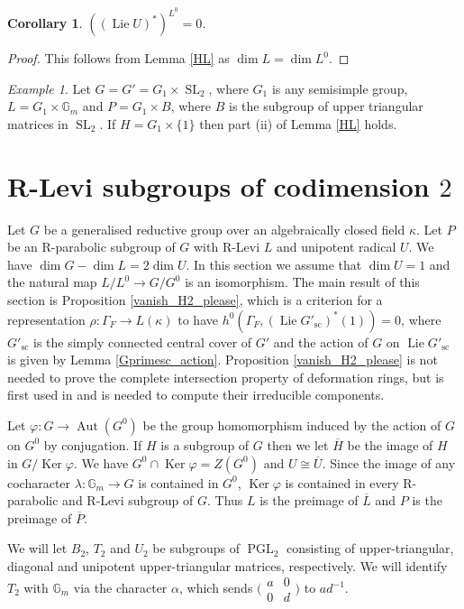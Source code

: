 \documentclass{amsart}
\newtheorem{cor}[prop]{Corollary}
\theoremstyle{definition}
\theoremstyle{remark}
\newtheorem{examp}[prop]{Example}
\DeclareMathOperator{\Aut}{Aut}
\DeclareMathOperator{\SL}{SL}
\DeclareMathOperator{\Ker}{Ker}
\newcommand{\Gm}{\mathbb G_{m}}
\DeclareMathOperator{\PGL}{PGL}
\DeclareMathOperator{\Lie}{Lie}
\newcommand{\Pbar}{\overline{P}}
\newcommand{\sic}{\operatorname{sc}}
\begin{document}
 \begin{cor}\label{Lzero} $((\Lie U)^*)^{L^0}=0$. 
 \end{cor}
 \begin{proof} This follows from Lemma \ref{HL} as $\dim L=\dim L^0$. 
 \end{proof} 
 
 \begin{examp} Let $G=G'= G_1\times \SL_2$, where $G_1$ is any semisimple group, 
 $L= G_1\times \Gm$ and $P= G_1\times B$, where $B$ is the subgroup of upper triangular 
 matrices in $\SL_2$. If $H=G_1\times\{1\}$ then part (ii) of Lemma \ref{HL} holds.
 \end{examp}

\section{\texorpdfstring{R-Levi subgroups of codimension $2$}{R-Levi subgroups of codimension 2}}\label{RLevi2} 

Let $G$ be a generalised reductive group over an algebraically closed field $\kappa$. 
Let $P$ be an R-parabolic subgroup of $G$ with R-Levi $L$ and unipotent radical $U$. 
We have $\dim G - \dim L = 2 \dim U$. In this section we assume that $\dim U=1$ and 
the natural map $L/L^0 \rightarrow G/G^0$ is an isomorphism. The main result of this 
section is Proposition \ref{vanish_H2_please}, which is a criterion for a representation 
$\rho: \Gamma_F \rightarrow L(\kappa)$ to have $h^0(\Gamma_F, (\Lie G'_{\sic})^*(1))=0$, 
where $G'_{\sic}$ is the simply connected central cover of $G'$ and the action of $G$ on 
$\Lie G'_{\sic}$ is given by Lemma \ref{Gprimesc_action}.
Proposition \ref{vanish_H2_please} is not needed to prove the complete intersection 
property of deformation rings, but is first used in   and is needed to compute their irreducible components. 

Let $\varphi: G \rightarrow \Aut(G^0)$ be the group homomorphism induced by the action of
$G$ on $G^0$ by conjugation. If $H$ is a subgroup of $G$ then we let 
$\overline{H}$ be the image  of $H$ in $G/\Ker \varphi$. We have $G^0\cap \Ker \varphi = Z(G^0)$ 
and $U \cong \overline{U}$. Since the image of any cocharacter 
$\lambda: \Gm \rightarrow G$ is contained in $G^0$, $\Ker \varphi$ is contained 
in every R-parabolic and R-Levi subgroup of $G$. Thus $L$ is the preimage of $\overline{L}$ and 
$P$ is the preimage of $\Pbar$. 

We will let $B_2$, $T_2$ and $U_2$ be subgroups of $\PGL_2$ consisting of upper-triangular, 
diagonal and unipotent upper-triangular  matrices, respectively. We will identify $T_2$ 
with $\Gm$ via the character $\alpha$, which sends $\bigl(\begin{smallmatrix} a & 0 \\ 0 & d \end{smallmatrix}\bigr)$ to $ad^{-1}$. 
\end{document}
